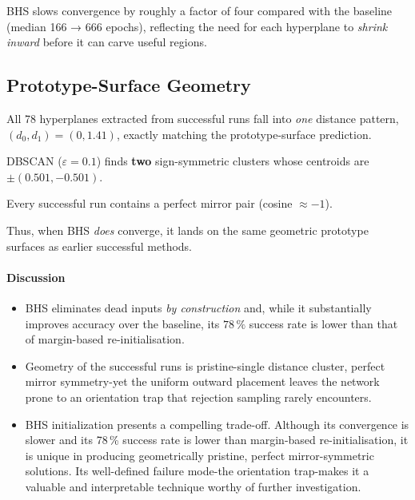 BHS slows convergence by roughly a factor of four compared with the
baseline (median 166 → 666 epochs), reflecting the need for each
hyperplane to \emph{shrink inward} before it can carve useful regions.

\subsection*{Prototype-Surface Geometry}

\begin{description}[leftmargin=2em]
  \item[Distance clusters]
        All 78 hyperplanes extracted from successful runs fall into
        \emph{one} distance pattern,
        \((d_{0},d_{1})\!=\!(0,1.41)\),
        exactly matching the prototype-surface prediction.
  \item[Weight clusters]
        DBSCAN ($\varepsilon=0.1$) finds \textbf{two}
        sign-symmetric clusters whose centroids are
        $\pm(0.501,-0.501)$.%
  \item[Mirror symmetry]
        Every successful run contains a perfect mirror pair
        (cosine $\approx -1$).%
\end{description}

Thus, when BHS \emph{does} converge, it lands on the
same geometric prototype surfaces as earlier successful methods.

\paragraph{Discussion}
\begin{itemize}
  \item BHS eliminates dead inputs \emph{by construction} and, while 
      it substantially improves accuracy over the baseline, its $78\,\%$ 
      success rate is lower than that of margin-based re-initialisation.
  \item Geometry of the successful runs is pristine-single distance
      cluster, perfect mirror symmetry-yet the uniform outward
      placement leaves the network prone to an orientation trap that
      rejection sampling rarely encounters.
  \item BHS initialization presents a compelling trade-off. Although 
      its convergence is slower and its 78\,\% success rate is lower than 
      margin-based re-initialisation, it is unique in producing geometrically 
      pristine, perfect mirror-symmetric solutions. Its well-defined failure 
      mode-the orientation trap-makes it a valuable and interpretable technique 
      worthy of further investigation.
\end{itemize}

\hrulefill
